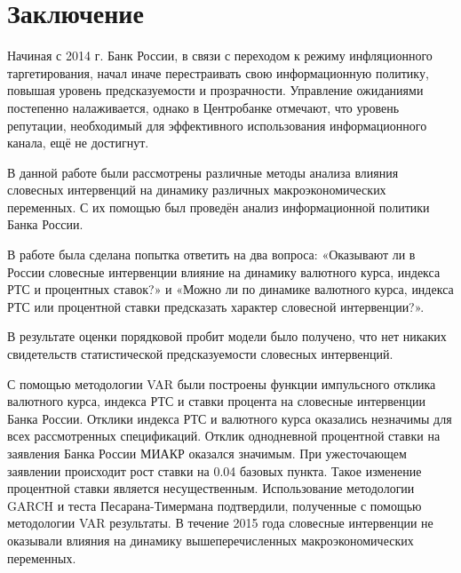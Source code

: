 \documentclass[14pt,a4paper, oneside]{extreport}
\begin{document}
\chapter*{Заключение}

Начиная с 2014 г. Банк России, в связи с переходом к режиму инфляционного таргетирования, начал иначе перестраивать свою информационную политику, повышая уровень предсказуемости и прозрачности. Управление ожиданиями постепенно налаживается, однако в Центробанке отмечают, что уровень репутации, необходимый для эффективного использования информационного канала, ещё не достигнут. 

В данной работе были рассмотрены различные методы анализа влияния словесных интервенций на динамику различных макроэкономических переменных. С их помощью был проведён анализ информационной политики Банка России.  

В работе была сделана попытка ответить на два вопроса: «Оказывают ли в России словесные интервенции влияние на динамику валютного курса, индекса РТС и процентных ставок?» и «Можно ли по динамике валютного курса, индекса РТС или процентной ставки предсказать характер словесной интервенции?». 

В результате оценки порядковой пробит модели было получено, что нет никаких свидетельств статистической предсказуемости словесных интервенций. 

С помощью методологии VAR были построены функции импульсного отклика валютного курса, индекса РТС и ставки процента на словесные интервенции Банка России. Отклики индекса РТС и валютного курса оказались незначимы для всех рассмотренных спецификаций. Отклик однодневной процентной ставки на заявления Банка России МИАКР оказался значимым. При ужесточающем заявлении происходит рост ставки на 0.04 базовых пункта. Такое изменение процентной ставки является несущественным. Использование методологии GARCH и теста Песарана-Тимермана подтвердили, полученные с помощью методологии VAR результаты. В течение 2015 года словесные интервенции не оказывали влияния на динамику вышеперечисленных макроэкономических переменных. 

\newpage



\renewcommand\bibname{Список литературы}
\end{document}
